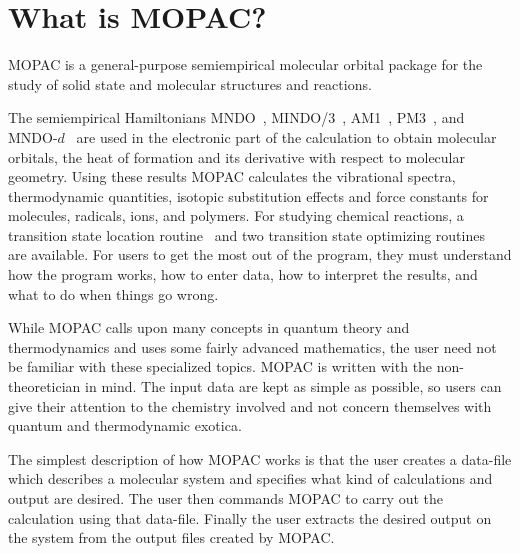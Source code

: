\section{What is MOPAC?}
MOPAC is a general-purpose semiempirical molecular orbital package for the
study of solid state and molecular structures and reactions.

The semiempirical Hamiltonians MNDO~\cite{mndo1}, MINDO/3~\cite{mindo3},
AM1~\cite{am1},  PM3~\cite{pm3-1}, and MNDO-$d$~\cite{mndod_0,mndod} are used
in the electronic  part of  the  calculation  to obtain molecular orbitals,
the heat of formation and its derivative with  respect  to  molecular
geometry.   Using  these results   MOPAC   calculates   the   vibrational
spectra,  thermodynamic quantities, isotopic substitution effects and force
constants  for molecules, radicals, ions, and polymers.
For studying  chemical reactions, a
transition state location routine~\cite{ef-ts}
and two  transition  state optimizing  routines~\cite{nllsq,sigma1,sigma2} are
available.   For users to get the most out of the program, they must understand
how the program works, how to  enter  data, how to interpret the results, and
what to do when things go wrong.

While  MOPAC  calls upon many  concepts in  quantum  theory and thermodynamics
and  uses some fairly advanced mathematics, the user need not be familiar with
these specialized topics.  MOPAC is written with the non-theoretician  in
mind.  The input data are kept as simple as possible, so users can give their
attention  to  the  chemistry  involved  and  not concern themselves with
quantum and thermodynamic exotica.

The simplest description of how MOPAC works is that the user creates a
data-file which describes a molecular system and specifies what kind of
calculations and output are desired.  The user  then  commands  MOPAC  to
carry  out  the  calculation  using  that  data-file.   Finally  the user
extracts the desired output on the system from the output  files  created by
MOPAC.

